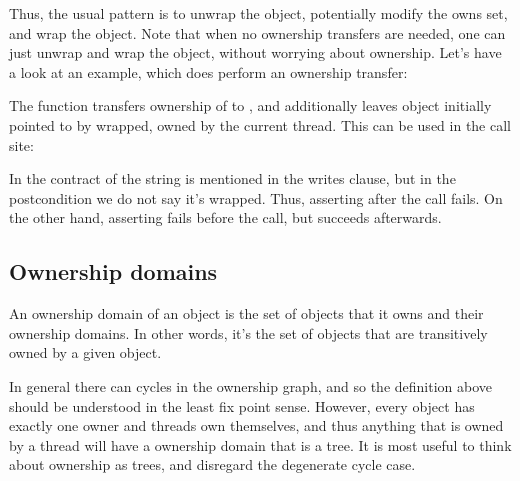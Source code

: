 Thus, the usual pattern is to unwrap the object, potentially modify the owns
set, and wrap the object.
Note that when no ownership transfers are needed, one can just unwrap
and wrap the object, without worrying about ownership.
Let's have a look at an example, which does perform an ownership transfer:


\noindent
The  function transfers ownership of  to ,
and additionally leaves object initially pointed to by 
wrapped, \ie owned by the current thread.
This can be used in the call site:


\noindent
In the contract of  the string  is mentioned
in the writes clause, but in the postcondition we do not say it's wrapped.
Thus, asserting  after the call fails.
On the other hand, asserting  fails before the call,
but succeeds afterwards.

%
%
%

\subsection{Ownership domains}

An ownership domain of an object  is the set of objects
that it owns and their ownership domains.
In other words, it's the set of objects that are transitively
owned by a given object.

In general there can cycles in the ownership graph,
and so the definition above should be understood in the least fix point sense.
However, every object has exactly one owner and threads own themselves,
and thus anything that
is owned by a thread will have a ownership domain that is a tree.
It is most useful to think about ownership as trees, and disregard
the degenerate cycle case.

